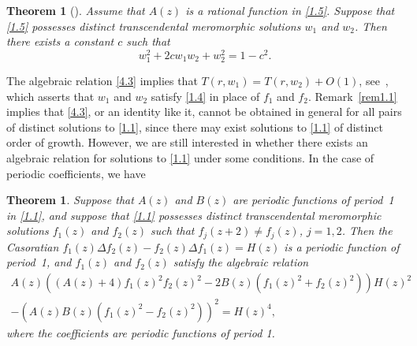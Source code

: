 \documentclass{amsart}
\newtheorem{lettertheorem}{Theorem}
\newtheorem{theorem}{Theorem}[section]
\begin{document}
\begin{lettertheorem}[\cite{ishizakit:07}]
Assume that $A(z)$ is a rational function in \eqref{1.5}. Suppose that \eqref{1.5} possesses distinct
transcendental meromorphic solutions $w_1$ and $w_2$. Then there exists a constant $c$ such that
\begin{equation}
w_1^2+2cw_1w_2+w_2^2=1-c^2.\label{4.3}
\end{equation}
\end{lettertheorem}


The algebraic relation \eqref{4.3} implies that $T(r, w_1)=T(r,w_2)+O(1)$,
see~\cite[Corollary~2.1]{ishizakit:07}, which asserts that $w_1$ and $w_2$ satisfy \eqref{1.4} in place of $f_1$ and $f_2$. Remark~\ref{rem1.1} implies that \eqref{4.3}, or an identity like it, cannot be obtained in general for all pairs of distinct solutions to \eqref{1.1}, since there may exist solutions to \eqref{1.1} of distinct order of growth.
However, we are still interested in whether there exists an algebraic relation for solutions to \eqref{1.1} under some conditions. In the case of periodic coefficients, we have

\begin{theorem}\label{thm4.1}
Suppose that $A(z)$ and $B(z)$ are periodic functions of period~1 in \eqref{1.1},
and suppose that \eqref{1.1} possesses distinct transcendental meromorphic solutions $f_1(z)$ and $f_2(z)$ such that $f_j(z+2)\ne f_j(z)$, $j=1, 2$.
Then the Casoratian $f_1(z)\Delta f_2(z)-f_2(z)\Delta f_1(z)=H(z)$ is a periodic
function of period~1, and $f_1(z)$ and $f_2(z)$ satisfy the algebraic relation
\begin{multline}
A(z)((A(z)+4)f_1(z)^2f_2(z)^2-2B(z)(f_1(z)^2+f_2(z)^2))H(z)^2\\
-(A(z)B(z)(f_1(z)^2-f_2(z)^2))^2=H(z)^4,\label{4.4}
\end{multline}
where the coefficients are periodic functions of period 1.
\end{theorem}

\end{document}
